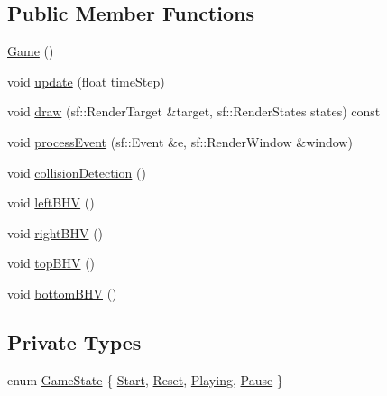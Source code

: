 \subsection*{Public Member Functions}
\begin{DoxyCompactItemize}
\item 
\hyperlink{class_game_ad59df6562a58a614fda24622d3715b65}{Game} ()
\item 
void \hyperlink{class_game_a92a5eb842e5b304e89dc2caf530f7a6d}{update} (float time\+Step)
\item 
void \hyperlink{class_game_a43337462c32106b3374a86a12a242ba0}{draw} (sf\+::\+Render\+Target \&target, sf\+::\+Render\+States states) const 
\item 
void \hyperlink{class_game_a53c3821c70ba6acb541bdbefac8d037c}{process\+Event} (sf\+::\+Event \&e, sf\+::\+Render\+Window \&window)
\item 
void \hyperlink{class_game_a04598b31d30614a0eda08dd8b3dcecb9}{collision\+Detection} ()
\item 
void \hyperlink{class_game_aea043c436651fa28343224e1e51c9e24}{left\+B\+HV} ()
\item 
void \hyperlink{class_game_a69f84b7c0e4565c690b22eb195937a00}{right\+B\+HV} ()
\item 
void \hyperlink{class_game_aa6b8153a760fbf3cef5e30157be3ee45}{top\+B\+HV} ()
\item 
void \hyperlink{class_game_ab974c9d1736297e36b8b91e3faaee637}{bottom\+B\+HV} ()
\end{DoxyCompactItemize}
\subsection*{Private Types}
\begin{DoxyCompactItemize}
\item 
enum \hyperlink{class_game_a7f57a7a8408e554d0a72882c287e1d04}{Game\+State} \{ \hyperlink{class_game_a7f57a7a8408e554d0a72882c287e1d04afa4424e746d7d1082d6e27c4811f3984}{Start}, 
\hyperlink{class_game_a7f57a7a8408e554d0a72882c287e1d04afc89c8495fe7b84c06560b6aa6195bbf}{Reset}, 
\hyperlink{class_game_a7f57a7a8408e554d0a72882c287e1d04ac5a0d20c5cb7b20c0f6cca50edeed64f}{Playing}, 
\hyperlink{class_game_a7f57a7a8408e554d0a72882c287e1d04ab2cf7098808338abae856bf46ac82b91}{Pause}
 \}
\end{DoxyCompactItemize}
